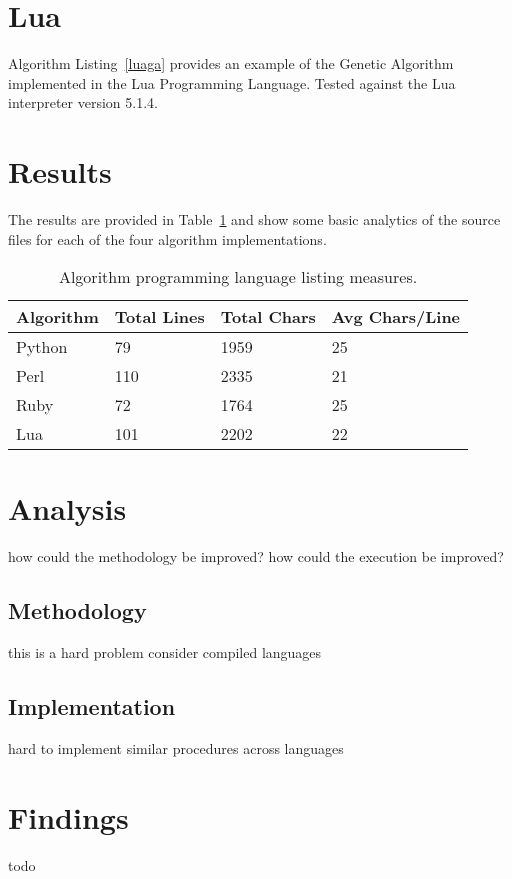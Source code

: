 \documentclass[a4paper, 11pt]{article}
\begin{document}
% 
% 
\section{Lua}
\label{sec:lua}
Algorithm Listing~\ref{luaga} provides an example of the Genetic Algorithm implemented in the Lua Programming Language. Tested against the Lua interpreter version 5.1.4.


% 
% 
\section{Results}
\label{sec:results}
The results are provided in Table~\ref{tab:implementation_results} and show some basic analytics of the source files for each of the four algorithm implementations.

\begin{table}[ht]
	\centering
		\begin{tabularx}{\textwidth}{lXXX}
		\toprule
		\textbf{Algorithm} & \textbf{Total Lines} & \textbf{Total Chars} & \textbf{Avg Chars/Line} \\ 
		\toprule
		Python & 79 & 1959 & 25 \\
		Perl & 110 & 2335 & 21 \\		
		Ruby & 72 & 1764 & 25 \\
		Lua & 101 & 2202 & 22 \\
		\bottomrule
		\end{tabularx}	
	\caption{Algorithm programming language listing measures.}
	\label{tab:implementation_results}
\end{table}

% 
% 
\section{Analysis}
\label{sec:analysis}
how could the methodology be improved?
how could the execution be improved?


\subsection{Methodology}
this is a hard problem
consider compiled languages


\subsection{Implementation}
hard to implement similar procedures across languages


% 
% 
\section{Findings}
\label{sec:findings}
todo





\end{document}
